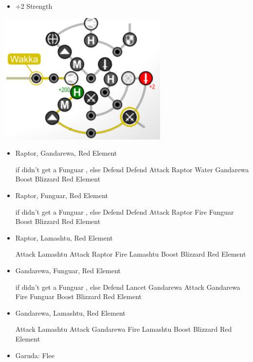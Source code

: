 \begin{spheregrid}
\begin{itemize}
\begin{itemize}
      \item +2 Strength
    \end{itemize}
    \includegraphics{graphics/wakkammr}
  \end{itemize}
\end{spheregrid}
\vfill
\begin{encounters}
  \begin{itemize} 
    \item Raptor, Gandarewa, Red Element
    \begin{itemize}
    	\switch{\tidus}{\kimahri} if didn't get a Funguar \od, else Defend
    	\kimahrif Defend
    	\wakkaf Attack Raptor
    	\summon{\valefor}
    	\valeforf  Water Gandarewa
	\valeforf Boost
	\valeforf Blizzard Red Element
	\end{itemize}
	\item Raptor, Funguar, Red Element
    \begin{itemize}
    	\switch{\tidus}{\kimahri} if didn't get a Funguar \od, else Defend
    	\kimahrif Defend
    	\wakkaf Attack Raptor
    	\summon{\valefor}
    	\valeforf  Fire Funguar
	\valeforf Boost
	\valeforf Blizzard Red Element
	\end{itemize}
	\item Raptor, Lamashtu, Red Element
	\begin{itemize}
	\switch{\tidus}{\kimahri}
	\kimahrif  Attack Lamashtu
	\wakkaf Attack Raptor
	\switch{\auron}{\yuna}
	\summon{\valefor}
	\valeforf Fire Lamashtu
	\valeforf Boost
	\valeforf Blizzard Red Element
	\end{itemize}
	\item Gandarewa, Funguar, Red Element
    \begin{itemize}
    	\switch{\tidus}{\kimahri} if didn't get a Funguar \od, else Defend
    	\kimahrif Lancet Gandarewa
    	\wakkaf  Attack Gandarewa
	\switch{\auron}{\yuna}
	\summon{\valefor}
	\valeforf Fire Funguar
	\valeforf Boost
	\valeforf Blizzard Red Element
	\end{itemize}
	\item Gandarewa, Lamashtu, Red Element
	\begin{itemize}
	\switch{\tidus}{\kimahri}
	\kimahrif  Attack Lamashtu
    	\wakkaf  Attack Gandarewa
	\switch{\auron}{\yuna}
	\summon{\valefor}
	\valeforf Fire Lamashtu
	\valeforf Boost
	\valeforf Blizzard Red Element
	\end{itemize}	
    \item Garuda: Flee
  \end{itemize}
\end{encounters}
